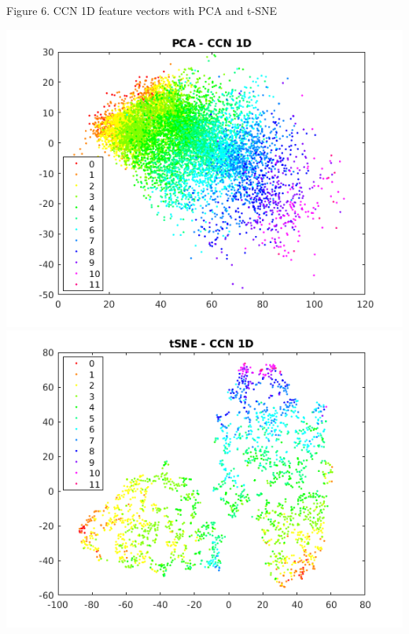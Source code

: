 \documentclass[a4paper]{article}
\begin{document}
\begin{center}
Figure 6. CCN 1D feature vectors with PCA and t-SNE
\end{center}
\begin{center}
\includegraphics[scale=0.25]{PCA_CCN_1D}
\includegraphics[scale=0.25]{tSNE_CCN_1D}
\end{center}
\end{document}
